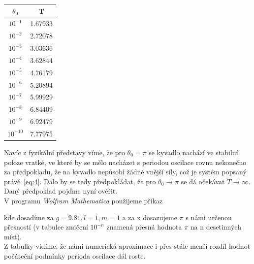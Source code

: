 \documentclass[reqno, a4paper]{amsart}
\begin{document}
	\begin{table}
		\begin{minipage}{\textwidth}
			\begin{minipage}[b]{0.25\textwidth}
				\centering
				\begin{tabular}{|c|c|}
					\hline
					$\theta_{0}$ & T \\ 
					\hline
					$ 10^{-1} $& 1.67933\\$ 10^{-2} $& 2.72078\\$ 10^{-3} $& 3.03636\\$ 10^{-4} $& 3.62844\\$ 10^{-5} $& 4.76179\\$ 10^{-6} $& 5.20894\\$ 10^{-7} $& 5.99929\\$ 10^{-8} $& 6.84409\\$ 10^{-9} $& 6.92479\\$ 10^{-10} $& 7.77975\\
					\hline
				\end{tabular}
			\end{minipage}
			\hfill
		\end{minipage}
	\end{table}
	
	Navíc z fyzikální představy víme, že pro $\theta_{0}=\pi$ se kyvadlo nachází ve stabilní poloze vratké, ve které by se mělo nacházet s periodou oscilace rovnu nekonečno za předpokladu, že na kyvadlo nepůsobí žádné vnější síly, což je systém popsaný právě~\eqref{eq:4}.
	Dalo by se tedy předpokládat, že pro $\theta_{0} \longrightarrow \pi$ se dá očekávat $T\longrightarrow \infty $. Daný předpoklad pojďme nyní ověřit.\\
	V programu \textit{Wolfram Mathematica} použijeme příkaz
	\begin{verbatim*}
		
		NDSolve[{(g*Sin[y[t]])/l+(y^\[Prime]\[Prime])[t]==0, 
			Derivative[1][y][0]==0,y[0]==x,WhenEvent[y[t]==0,{Print[t],
				"StopIntegration"}]},y,{t,0,50}],
		
	\end{verbatim*}
	kde dosadíme za $ g=9.81, l=1, m=1$  a za x dosazujeme $ \pi $ s námi určenou přesností (v tabulce značení $ 10^{-n} $ znamená přesná hodnota $ \pi $ na n desetinných míst).\\
	
	Z tabulky vidíme, že námi numerická aproximace i přes stále menší rozdíl hodnot počáteční podmínky perioda oscilace dál roste. 
\end{document}
